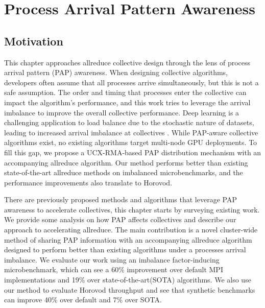 
\chapter[Process Arrival Pattern Awareness]{Process Arrival Pattern Awareness}\label{ch:PAPAwareness}

\section{Motivation}
This chapter approaches allreduce collective design through the lens of process arrival pattern (PAP) awareness. 
When designing collective algorithms, developers often assume that all processes arrive simultaneously, but this is not a safe assumption.
The order and timing that processes enter the collective can impact the algorithm's performance, and this work tries to leverage the arrival imbalance to improve the overall collective performance.
Deep learning is a challenging application to load balance due to the stochastic nature of datasets, leading to increased arrival imbalance at collectives \cite{Mohammadalizadehbakhtevari2021Thesis, Alizadeh2022PAPCollDL, Li2020DLPartialColl}. 
While PAP-aware collective algorithms exist, no existing algorithms target multi-node GPU deployments. 
To fill this gap, we propose a UCX-RMA-based PAP distribution mechanism with an accompanying allreduce algorithm.
Our method performs better than existing state-of-the-art allreduce methods on imbalanced microbenchmarks, and the performance improvements also translate to Horovod.

There are previously proposed methods and algorithms that leverage PAP awareness to accelerate collectives, this chapter starts by surveying existing work.
We provide some analysis on how PAP affects collectives and describe our approach to accelerating allreduce.
The main contribution is a novel cluster-wide method of sharing PAP information with an accompanying allreduce algorithm designed to perform better than existing algorithms under a processes arrival imbalance.
We evaluate our work using an imbalance factor-inducing microbenchmark, which can see a 60\% improvement over default MPI implementations and 19\% over state-of-the-art(SOTA) algorithms.
We also use our method to evaluate Horovod throughput and see that synthetic benchmarks can improve 40\% over default and 7\% over SOTA.

